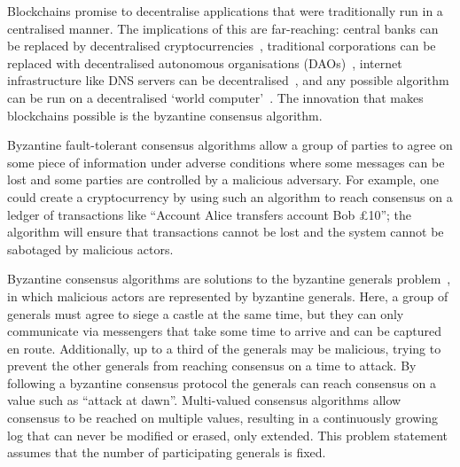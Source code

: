 
Blockchains promise to decentralise applications that were traditionally run in a centralised manner. The implications of this are far-reaching: central banks can be replaced by decentralised cryptocurrencies~\cite{nakamotoBitcoinPeertoPeerElectronic2008,perniceCryptocurrency2021}, traditional corporations can be replaced with decentralised autonomous organisations (DAOs)~\cite{hassanDecentralizedAutonomousOrganization2021,ethereumWhite}, internet infrastructure like DNS servers can be decentralised~\cite{EthereumNameService}, and any possible algorithm can be run on a decentralised `world computer'~\cite{ethereumWhite,ethereumYellow}. The innovation that makes blockchains possible is the byzantine consensus algorithm.

Byzantine fault-tolerant consensus algorithms allow a group of parties to agree on some piece of information under adverse conditions where some messages can be lost and some parties are controlled by a malicious adversary. For example, one could create a cryptocurrency by using such an algorithm to reach consensus on a ledger of transactions like ``Account Alice transfers account Bob £10''; the algorithm will ensure that transactions cannot be lost and the system cannot be sabotaged by malicious actors.

Byzantine consensus algorithms are solutions to the byzantine generals problem~\cite{lamportByzantineGeneralsProblem1982}, in which malicious actors are represented by byzantine generals. Here, a group of generals must agree to siege a castle at the same time, but they can only communicate via messengers that take some time to arrive and can be captured en route. Additionally, up to a third of the generals may be malicious, trying to prevent the other generals from reaching consensus on a time to attack. By following a byzantine consensus protocol the generals can reach consensus on a value such as ``attack at dawn''. Multi-valued consensus algorithms allow consensus to be reached on multiple values, resulting in a continuously growing log that can never be modified or erased, only extended. This problem statement assumes that the number of participating generals is fixed.

